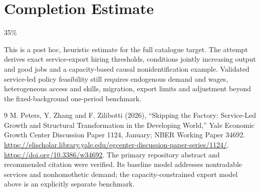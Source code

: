 \documentclass[11pt,a4paper]{article}
\theoremstyle{definition}
\theoremstyle{remark}
\begin{document}
\section{Completion Estimate}
35\%

This is a post hoc, heuristic estimate for the full catalogue target.
The attempt derives exact service-export hiring thresholds, conditions jointly increasing output and good jobs and a capacity-based causal nonidentification example. Validated service-led policy feasibility still requires endogenous demand and wages, heterogeneous access and skills, migration, export limits and adjustment beyond the fixed-background one-period benchmark.

\begin{thebibliography}{9}
 M. Peters, Y. Zhang and F. Zilibotti (2026), ``Skipping the Factory: Service-Led Growth and Structural Transformation in the Developing World,'' Yale Economic Growth Center Discussion Paper 1124, January; NBER Working Paper 34692. \url{https://elischolar.library.yale.edu/egcenter-discussion-paper-series/1124/}. \url{https://doi.org/10.3386/w34692}. The primary repository abstract and recommended citation were verified. Its baseline model addresses nontradable services and nonhomothetic demand; the capacity-constrained export model above is an explicitly separate benchmark.
\end{thebibliography}
\end{document}
